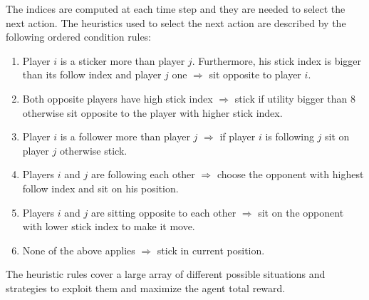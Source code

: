 \documentclass[runningheads]{llncs}
\begin{document}
The indices are computed at each time step and they are needed to
select the next action. The heuristics used to select the next action
are described by the following ordered condition rules:
\begin{enumerate}
\item Player $i$ is a sticker more than player $j$. Furthermore, his
  stick index is bigger than its follow index and player $j$
  one $\Rightarrow$ sit opposite to player $i$.
\item Both opposite players have high stick index $\Rightarrow$ stick
  if utility bigger than 8 otherwise sit opposite to the player with
  higher stick index.
\item Player $i$ is a follower more than player $j$ $\Rightarrow$
  if player $i$ is following $j$ sit on player $j$ otherwise stick.
\item Players $i$ and $j$ are following each other $\Rightarrow$
  choose the opponent with highest follow index and sit on his position. 
\item Players $i$ and $j$ are sitting opposite to each other
  $\Rightarrow$ sit on the opponent with lower stick index to make it
  move.
\item None of the above applies $\Rightarrow$ stick in current position.
\end{enumerate}
The heuristic rules cover a large array of different possible
situations and strategies to exploit them and maximize the agent total
reward.
\end{document}
